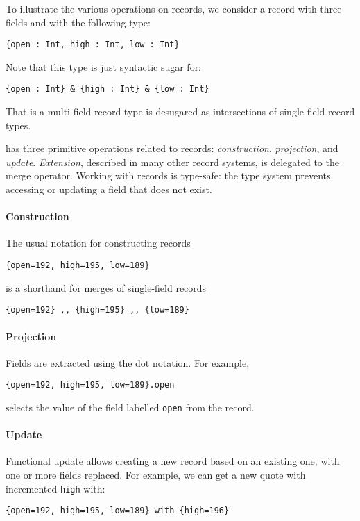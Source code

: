 To illustrate the various operations on records, we consider a record
with three fields and with the following type:

\begin{lstlisting}
{open : Int, high : Int, low : Int} 
\end{lstlisting}

\noindent Note that this type is just syntactic sugar for:

\begin{lstlisting}
{open : Int} & {high : Int} & {low : Int} 
\end{lstlisting}

\noindent That is a multi-field record type is desugared as
intersections of single-field record types.

\name has three primitive operations related to records: \emph{construction},
\emph{projection}, and \emph{update}. \emph{Extension}, described in many other
record systems, is delegated to the merge operator. Working
with records is type-safe: the type system prevents accessing or updating a
field that does not exist.

\paragraph{Construction} The usual notation for constructing records
\begin{lstlisting}
{open=192, high=195, low=189} 
\end{lstlisting}
is a shorthand for merges of single-field records
\begin{lstlisting}
{open=192} ,, {high=195} ,, {low=189} 
\end{lstlisting}

\paragraph{Projection}
Fields are extracted using the dot notation. For example,
\begin{lstlisting}
{open=192, high=195, low=189}.open
\end{lstlisting}
selects the value of the field labelled \lstinline{open} from the record.

\paragraph{Update}
Functional update allows creating a new record based on an existing one, with
one or more fields replaced. For example, we
can get a new quote with incremented \lstinline{high} with:
\begin{lstlisting}
{open=192, high=195, low=189} with {high=196}
\end{lstlisting}

